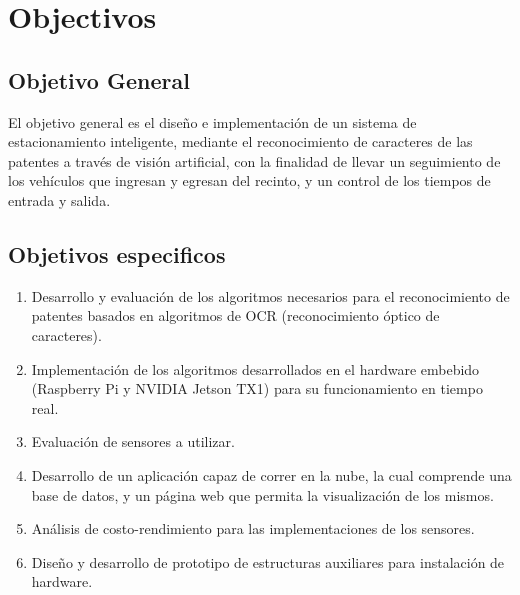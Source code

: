 \section{Objectivos}

\subsection*{Objetivo General}

El objetivo general es el diseño e implementación de un sistema de estacionamiento inteligente, mediante el reconocimiento de caracteres de las patentes a través de visión artificial, con la finalidad de llevar un seguimiento de los vehículos que ingresan y egresan del recinto, y un control de los tiempos de entrada y salida.

\subsection*{Objetivos especificos}

\begin{enumerate}
    \item Desarrollo y evaluación de los algoritmos necesarios para el reconocimiento de patentes basados en algoritmos de OCR (reconocimiento óptico de caracteres).
    \item Implementación de los algoritmos desarrollados en el hardware embebido (Raspberry Pi y NVIDIA Jetson TX1) para su funcionamiento en tiempo real.
    \item Evaluación de sensores a utilizar.
    \item Desarrollo de un aplicación capaz de correr en la nube, la cual comprende una base de datos, y un página web que permita la visualización de los mismos.
    \item Análisis de costo-rendimiento para las implementaciones de los sensores.
    \item Diseño y desarrollo de prototipo de estructuras auxiliares para instalación de hardware.
\end{enumerate}






